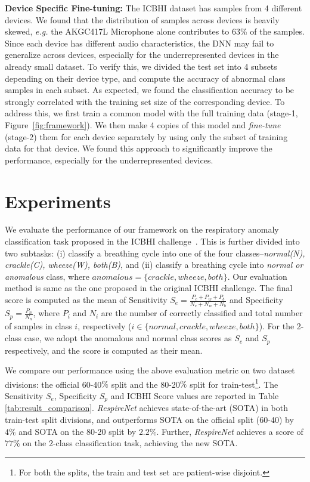\documentclass{article}
\newcommand{\method}{\textit{RespireNet}}
\begin{document}
\smallskip\noindent\textbf{Device Specific Fine-tuning:} The ICBHI dataset has samples from 4 different devices. We found that the distribution of samples across devices is heavily skewed, \textit{e.g.} the AKGC417L Microphone alone contributes to 63\% of the samples. Since each device has different audio characteristics, the DNN may fail to generalize across devices, especially for the underrepresented devices in the already small dataset. To verify this, we divided the test set into 4 subsets depending on their device type, and compute the accuracy of abnormal class samples in each subset. As expected, we found the classification accuracy to be strongly correlated with the training set size of the corresponding device.
To address this, we first train a common model with the full training data (stage-1, Figure~\ref{fig:framework}). We then make 4 copies of this model and \textit{fine-tune} (stage-2) them for each device separately by using only the subset of training data for that device. We found this approach to significantly improve the performance, especially for the underrepresented devices. \vspace{-2mm}
\section{Experiments}
\vspace{-2mm}

We evaluate the performance of our framework on the respiratory anomaly classification task proposed in the ICBHI challenge~\cite{icbhi_17}. This is further divided into two subtasks: (i) classify a breathing cycle into one of the four classes--\textit{normal(N), crackle(C), wheeze(W), both(B)}, and (ii) classify a breathing cycle into \textit{normal or anomalous} class, where $anomalous = \{crackle, wheeze, both\}$.
Our evaluation method is same as the one proposed in the original ICBHI challenge. The final score is computed as the mean of Sensitivity $S_e=\frac{P_c + P_w + P_b}{N_c + N_w + N_b}$ and Specificity $S_p=\frac{P_n}{N_n}$, where $P_i$ and $N_i$ are the number of correctly classified and total number of samples in class $i$, respectively ($i \in \{normal, crackle, wheeze, both\}$).
For the 2-class case, we adopt the anomalous and normal class scores as $S_e$ and $S_p$ respectively, and the score is computed as their mean.

We compare our performance using the above evaluation metric on two dataset divisions: the official 60-40$\%$ split \cite{icbhi_17} and the 80-20$\%$ split \cite{lungbrn_19, lungrn_20, acharya_20} for train-test\footnote{For both the splits, the train and test set are patient-wise disjoint.}. The Sensitivity $S_e$, Specificity $S_p$ and ICBHI Score values are reported in Table \ref{tab:result_comparison}. \method{} achieves state-of-the-art (SOTA) in both train-test split divisions, and outperforms SOTA \cite{lungrn_20} on the official split (60-40) by $4\%$ and SOTA \cite{acharya_20} on the 80-20 split by $2.2\%$. Further, \method{} achieves a score of $77\%$ on the 2-class classification task, achieving the new SOTA.
\end{document}
